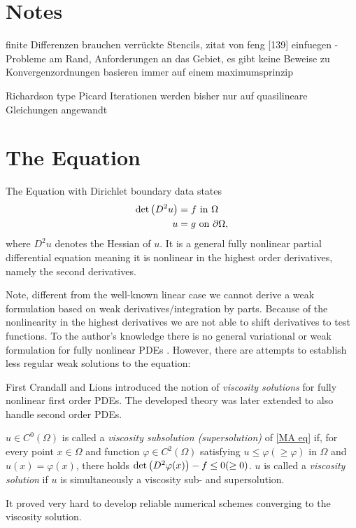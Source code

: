 \section{Notes}
finite Differenzen brauchen verrückte Stencils, zitat von feng [139] einfuegen - Probleme am Rand, Anforderungen an das Gebiet, es gibt keine Beweise zu Konvergenzordnungen
basieren immer auf einem maximumsprinzip

Richardson type Picard Iterationen werden bisher nur auf quasilineare Gleichungen angewandt


\section{The \MA Equation}

The \MA Equation with Dirichlet boundary data states
\begin{align}
	 \det{\left(D^2 u\right)} &= f \textnormal{ in } \Omega \label{MA eq}\\
	 u & = g \textnormal{ on } \partial \Omega,
\end{align}
where $D^2 u$ denotes the Hessian of $u$.
It is a general fully nonlinear partial differential equation meaning it is nonlinear in the highest order derivatives, namely the second derivatives.

Note, different from the well-known linear case we cannot derive a weak formulation based on weak derivatives/integration by parts. Because of the nonlinearity in the highest derivatives we are not able to shift derivatives to test functions. To the author's knowledge there is no general variational or weak formulation for fully nonlinear PDEs \cite{FGN2013}.
However, there are attempts to establish less regular weak solutions to the \MA equation:

First Crandall and Lions \cite{CL1983} introduced the notion of \emph{viscosity solutions} for fully nonlinear first order PDEs. The developed theory was later extended to also handle second order PDEs.
\begin{definition}
	$u \in C^0(\Omega)$ is called a \emph{viscosity subsolution (supersolution)} of \eqref{MA eq} if, for every point $x \in \Omega$ and function $\varphi \in C^2(\Omega)$ satisfying $u \leq \varphi (\geq \varphi)$ in $\Omega$ and $u(x) = \varphi(x)$, there holds $\det{\left(D^2 \varphi(x)\right)} - f \leq 0 (\geq 0)$. 
	$u$ is called a \emph{viscosity solution} if $u$ is simultaneously a viscosity sub- and supersolution.
\end{definition}
It proved very hard to develop reliable numerical schemes converging to the viscosity solution.

